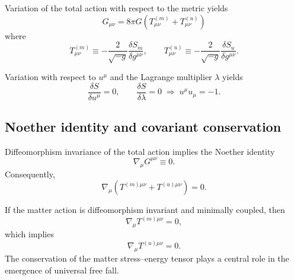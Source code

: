 \documentclass[11pt]{article}
\begin{document}
        Variation of the total action with respect to the metric yields
        \begin{equation}
            \boxed{
            G_{\mu\nu}
            =
            8\pi G\left(T^{(m)}_{\mu\nu} + T^{(u)}_{\mu\nu}\right)
            }
        \end{equation}
        where
        \begin{equation}
            T^{(m)}_{\mu\nu}
            \equiv
            -\frac{2}{\sqrt{-g}}
            \frac{\delta S_m}{\delta g^{\mu\nu}},
            \qquad
            T^{(u)}_{\mu\nu}
            \equiv
            -\frac{2}{\sqrt{-g}}
            \frac{\delta S_u}{\delta g^{\mu\nu}} .
        \end{equation}

        Variation with respect to $u^\mu$ and the Lagrange multiplier $\lambda$ yields
        \begin{equation}
            \frac{\delta S}{\delta u^\mu} = 0,
            \qquad
            \frac{\delta S}{\delta \lambda} = 0
            \;\Rightarrow\;
            u^\mu u_\mu = -1 .
        \end{equation}

    \subsection{Noether identity and covariant conservation}

        Diffeomorphism invariance of the total action implies the Noether identity
        \begin{equation}
            \nabla_\mu G^{\mu\nu} \equiv 0 .
        \end{equation}
        Consequently,
        \begin{equation}
            \nabla_\mu\!\left(
                            T^{(m)\mu\nu}
                            +
                            T^{(u)\mu\nu}
            \right) = 0 .
        \end{equation}

        If the matter action is diffeomorphism invariant and minimally coupled, then
        \begin{equation}
            \nabla_\mu T^{(m)\mu\nu} = 0 ,
        \end{equation}
        which implies
        \begin{equation}
            \nabla_\mu T^{(u)\mu\nu} = 0 .
        \end{equation}
        The conservation of the matter stress--energy tensor plays a central role in the
        emergence of universal free fall.
\end{document}
